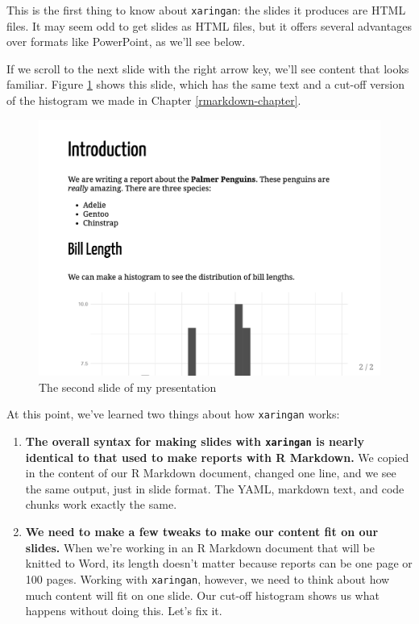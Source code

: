\documentclass[
]{book}
\begin{document}
This is the first thing to know about \texttt{xaringan}: the slides it produces are HTML files. It may seem odd to get slides as HTML files, but it offers several advantages over formats like PowerPoint, as we'll see below.

If we scroll to the next slide with the right arrow key, we'll see content that looks familiar. Figure \ref{fig:penguins-report-slide-2} shows this slide, which has the same text and a cut-off version of the histogram we made in Chapter \ref{rmarkdown-chapter}.

\begin{figure}
\includegraphics[width=1\linewidth]{assets/penguins-report-slide-2} \caption{The second slide of my presentation}\label{fig:penguins-report-slide-2}
\end{figure}

At this point, we've learned two things about how \texttt{xaringan} works:

\begin{enumerate}
\def\labelenumi{\arabic{enumi}.}
\item
  \textbf{The overall syntax for making slides with \texttt{xaringan} is nearly identical to that used to make reports with R Markdown.} We copied in the content of our R Markdown document, changed one line, and we see the same output, just in slide format. The YAML, markdown text, and code chunks work exactly the same.
\item
  \textbf{We need to make a few tweaks to make our content fit on our slides.} When we're working in an R Markdown document that will be knitted to Word, its length doesn't matter because reports can be one page or 100 pages. Working with \texttt{xaringan}, however, we need to think about how much content will fit on one slide. Our cut-off histogram shows us what happens without doing this. Let's fix it.
\end{enumerate}
\end{document}
